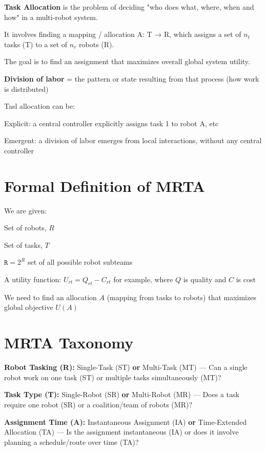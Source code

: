 \textbf{Task Allocation} is the problem of deciding "who does what, where, when and how" in a multi-robot system.

It involves finding a mapping / allocation A: T → R, which assigns a set of $n_t$ tasks (T) to a set of $n_r$ robots (R).

The goal is to find an assignment that maximizes overall global system utility.

\textbf{Division of labor} = the pattern or state resulting from that process (how work is distributed)

Tasl allocation can be:
\begin{tightitemize}
    \item Explicit: a central controller explicitly assigns task 1 to robot A, etc 
    \item Emergent: a division of labor emerges from local interactions, without any central controller
\end{tightitemize}

\section*{Formal Definition of MRTA}

We are given:
\begin{tightitemize}
    \item Set of robots, $R$
    \item Set of tasks, $T$
    \item $\mathtt{R} = 2^R$ set of all possible robot subteams
    \item A utility function:
    $U_{rt} = Q_{rt} - C_{rt}$ for example, where $Q$ is quality and $C$ is cost
\end{tightitemize}

We need to find an allocation $A$ (mapping from tasks to robots) that maximizes 
global objective $U(A)$

\section*{MRTA Taxonomy}

\begin{tightitemize}
  \item \textbf{Robot Tasking (R):} Single-Task (ST) \textbf{or} Multi-Task (MT) — Can a single robot work on one task (ST) or multiple tasks simultaneously (MT)?
  \item \textbf{Task Type (T):} Single-Robot (SR) \textbf{or} Multi-Robot (MR) — Does a task require one robot (SR) or a coalition/team of robots (MR)?
  \item \textbf{Assignment Time (A):} Instantaneous Assignment (IA) \textbf{or} Time-Extended Allocation (TA) — Is the assignment instantaneous (IA) or does it involve planning a schedule/route over time (TA)?
\end{tightitemize}

